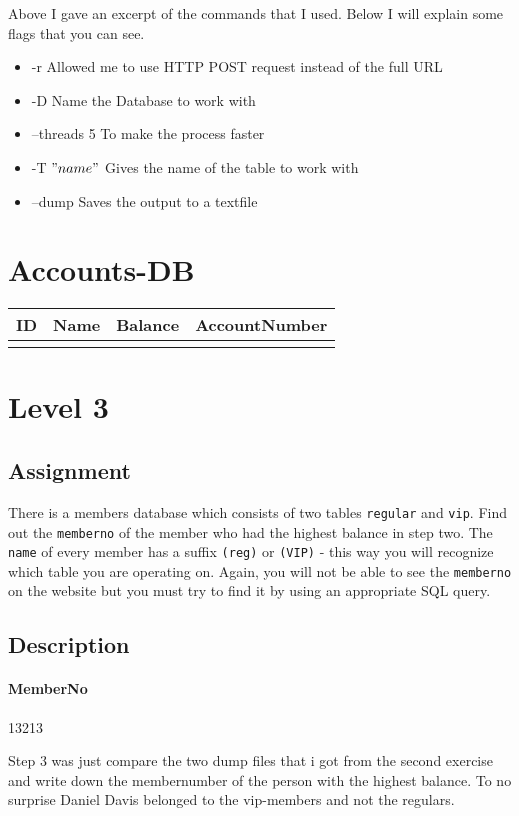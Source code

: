 \documentclass{scrartcl}
\newcommand\solution[2]{{\paragraph{#1}#2}}
\begin{document}
	Above I gave an excerpt of the commands that I used. Below I will explain some flags that you can see.
	
	\begin{itemize}
		\item -r 			Allowed me to use HTTP POST request instead of the full URL
		\item -D			Name the Database to work with
		\item --threads 5	To make the process faster
		\item -T $"name"$	Gives the name of the table to work with
		\item --dump		Saves the output to a textfile
	\end{itemize}	
	
	\section*{Accounts-DB}
	\begin{tabular}[H]{|r|l|r|c|}
		\bfseries ID & \bfseries Name & \bfseries Balance & \bfseries AccountNumber
		\csvreader[head to column names]{accounts.csv}{}	
		{\\ \hline\id  & \name & \balance & \accountno} 
	\end{tabular}
	
	

	
	
	\section*{Level 3}
	\subsection*{Assignment}
	There is a members database which consists of two tables \texttt{regular} and
	\texttt{vip}. Find out the \texttt{memberno} of the member who had the highest
	balance in step two. The \texttt{name} of every member has a suffix
	\texttt{(reg)} or \texttt{(VIP)} - this way you will recognize which table you are operating on. Again, you will
	not be able to see the \texttt{memberno} on the website but you must try to find it by
	using an appropriate SQL query.
	
	\subsection*{Description}
	\solution{MemberNo}{13213}
	
	Step 3 was just compare the two dump files that i got from the second exercise and write down the membernumber of the person with the highest balance. To no surprise Daniel Davis belonged to the vip-members and not the regulars.  \\
\end{document}

